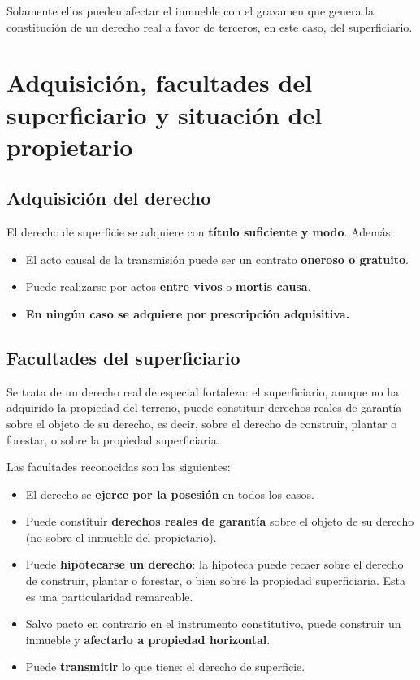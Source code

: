 \documentclass[12pt,oneside]{book}
\begin{document}
Solamente ellos pueden afectar el inmueble con el gravamen que genera la constitución de un derecho real a favor de terceros, en este caso, del superficiario.

\chapter[Adquisición y facultades]{Adquisición, facultades del superficiario y situación del propietario}

\section{Adquisición del derecho}

El derecho de superficie se adquiere con \textbf{título suficiente y modo}. Además:

\begin{itemize}
    \item El acto causal de la transmisión puede ser un contrato \textbf{oneroso o gratuito}.
    \item Puede realizarse por actos \textbf{entre vivos} o \textbf{mortis causa}.
    \item \textbf{En ningún caso se adquiere por prescripción adquisitiva.}
\end{itemize}

\section{Facultades del superficiario}

Se trata de un derecho real de especial fortaleza: el superficiario, aunque no ha adquirido la propiedad del terreno, puede constituir derechos reales de garantía sobre el objeto de su derecho, es decir, sobre el derecho de construir, plantar o forestar, o sobre la propiedad superficiaria.

Las facultades reconocidas son las siguientes:

\begin{itemize}
    \item El derecho se \textbf{ejerce por la posesión} en todos los casos.
    \item Puede constituir \textbf{derechos reales de garantía} sobre el objeto de su derecho (no sobre el inmueble del propietario).
    \item Puede \textbf{hipotecarse un derecho}: la hipoteca puede recaer sobre el derecho de construir, plantar o forestar, o bien sobre la propiedad superficiaria. Esta es una particularidad remarcable.
    \item Salvo pacto en contrario en el instrumento constitutivo, puede construir un inmueble y \textbf{afectarlo a propiedad horizontal}.
    \item Puede \textbf{transmitir} lo que tiene: el derecho de superficie.
\end{itemize}
\end{document}
